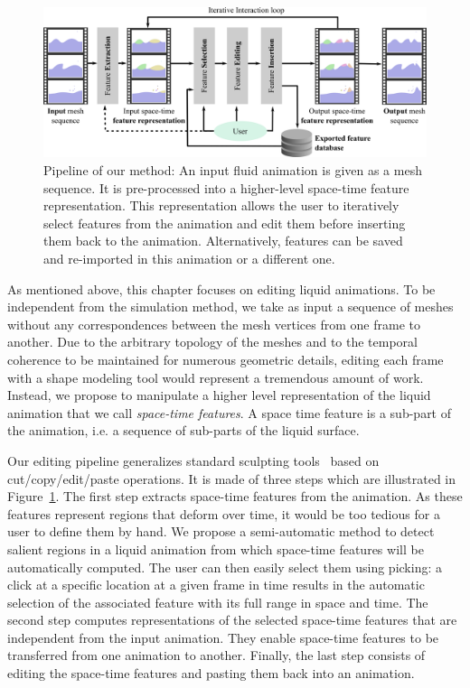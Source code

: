 \begin{figure}[htp!]
\centering
\includegraphics[width=\linewidth]{images/fluidsculpting-mig2016/overview_2.png}
\caption[Fluid sculpting: Overview]{
Pipeline of our method: 
An input fluid animation is given as a mesh sequence. 
It is pre-processed into a higher-level space-time feature representation. 
This representation allows the user to iteratively select features from the animation and edit them before inserting them back to the animation. 
Alternatively, features can be saved and re-imported in this animation or a different one. }
\label{fig:overview}
\end{figure}

As mentioned above, this chapter focuses on editing liquid animations.
To be independent from the simulation method, we take as input a sequence of meshes without any correspondences between the mesh vertices from one frame to another. 
Due to the arbitrary topology of the meshes and to the temporal coherence to be maintained for numerous geometric details, editing each frame with a shape modeling tool would represent a tremendous amount of work.
Instead, we propose to manipulate a higher level representation of the liquid animation that we call \emph{space-time features}. A space time feature is a sub-part of the animation, i.e. a sequence of sub-parts of the liquid surface. 

Our editing pipeline generalizes standard sculpting tools~\cite{Ferley2000} based on cut/copy/edit/paste operations.
It is made of three steps which are illustrated in Figure~\ref{fig:overview}. 
The first step extracts space-time features from the animation. As these features represent regions that deform over time, it would be too tedious for a user to define them by hand. We propose a semi-automatic method to detect salient regions in a liquid animation from which space-time features will be automatically computed. 
The user can then easily select them using picking: a click at a specific location at a given frame in time results in the automatic selection of the associated feature with its full range in space and time.
The second step computes representations of the selected space-time features that are independent from the input animation.
They enable space-time features to be transferred from one animation to another. 
Finally, the last step consists of editing the space-time features and pasting them back into an animation.


